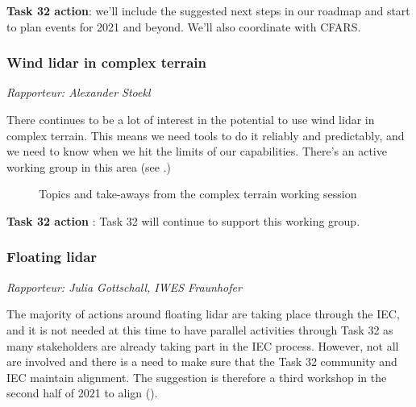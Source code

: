 \textbf{Task 32 action}: we'll include the suggested next steps in our roadmap and start to plan events for 2021 and beyond. We'll also coordinate with CFARS.

\subsubsection{Wind lidar in complex terrain}

\emph{Rapporteur: Alexander Stoekl}

There continues to be a lot of interest in the potential to use wind lidar in complex terrain. This means we need tools to do it reliably and predictably, and we need to know when we hit the limits of our capabilities. There's an active working group in this area (see .)

\begin{figure}[p]
    \centering
    \caption{Topics and take-aways from the complex terrain working session}
    \label{fig:day3-complex-terrain}
\end{figure}

\textbf{Task 32 action} : Task 32 will continue to support this working
group.

\subsubsection{Floating lidar}

\emph{Rapporteur: Julia Gottschall, IWES Fraunhofer}

The majority of actions around floating lidar are taking place through the IEC, and it is not needed at this time to have parallel activities through Task 32 as many stakeholders are already taking part in the IEC process. However, not all are involved and there is a need to make sure that the Task 32 community and IEC maintain alignment. The suggestion is therefore a third workshop in the second half of 2021 to align ().

